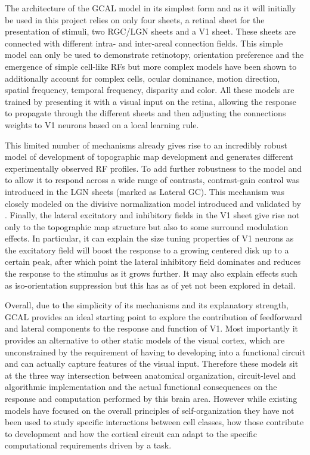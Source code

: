 The architecture of the GCAL model in its simplest form and as it will
initially be used in this project relies on only four sheets, a
retinal sheet for the presentation of stimuli, two RGC/LGN sheets and
a V1 sheet. These sheets are connected with different intra- and
inter-areal connection fields. This simple model can only be used to
demonstrate retinotopy, orientation preference and the emergence of
simple cell-like RFs but more complex models have been shown to
additionally account for complex cells, ocular dominance, motion
direction, spatial frequency, temporal frequency, disparity and
color. All these models are trained by presenting it with a visual
input on the retina, allowing the response to propagate through the
different sheets and then adjusting the connections weights to V1
neurons based on a local learning rule.

This limited number of mechanisms already gives rise to an incredibly
robust model of development of topographic map development and
generates different experimentally observed RF profiles. To add
further robustness to the model and to allow it to respond across a
wide range of contrasts, contrast-gain control was introduced in the
LGN sheets (marked as Lateral GC). This mechanism was closely modeled
on the divisive normalization model introduced and validated by
\cite{Bonin2005}. Finally, the lateral excitatory and inhibitory
fields in the V1 sheet give rise not only to the topographic map
structure but also to some surround modulation effects. In particular,
it can explain the size tuning properties of V1 neurons as the
excitatory field will boost the response to a growing centered disk up
to a certain peak, after which point the lateral inhibitory field
dominates and reduces the response to the stimulus as it grows
further. It may also explain effects such as iso-orientation
suppression but this has as of yet not been explored in detail.

Overall, due to the simplicity of its mechanisms and its explanatory
strength, GCAL provides an ideal starting point to explore the
contribution of feedforward and lateral components to the response and
function of V1. Most importantly it provides an alternative to other
static models of the visual cortex, which are unconstrained by the
requirement of having to developing into a functional circuit and can
actually capture features of the visual input. Therefore these models
sit at the three way intersection between anatomical organization,
circuit-level and algorithmic implementation and the actual functional
consequences on the response and computation performed by this brain
area. However while existing models have focused on the overall
principles of self-organization they have not been used to study
specific interactions between cell classes, how those contribute to
development and how the cortical circuit can adapt to the specific
computational requirements driven by a task.

